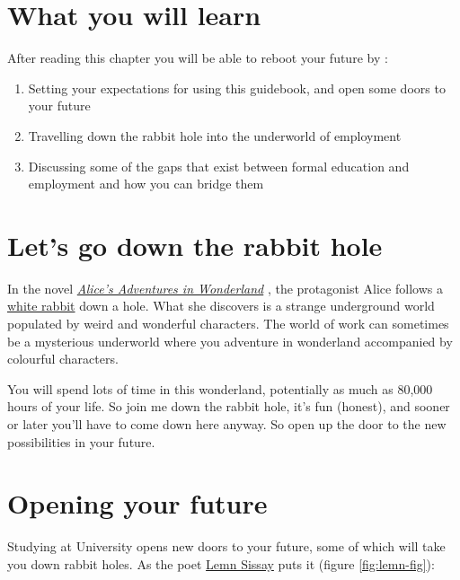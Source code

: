 \documentclass[
]{book}
\providecommand{\tightlist}{%
  \setlength{\itemsep}{0pt}\setlength{\parskip}{0pt}}
\begin{document}
\hypertarget{ilo1}{%
\section{What you will learn}\label{ilo1}}

After reading this chapter you will be able to reboot your future by :

\begin{enumerate}
\def\labelenumi{\arabic{enumi}.}
\tightlist
\item
  Setting your expectations for using this guidebook, and open some doors to your future
\item
  Travelling down the rabbit hole into the underworld of employment
\item
  Discussing some of the gaps that exist between formal education and employment and how you can bridge them
\end{enumerate}

\hypertarget{wonderland}{%
\section{Let's go down the rabbit hole}\label{wonderland}}

In the novel \emph{\href{https://en.wikipedia.org/wiki/Alice\%27s_Adventures_in_Wonderland}{Alice's Adventures in Wonderland}} \citep{wonderland}, the protagonist Alice follows a \href{https://en.wikipedia.org/wiki/White_Rabbit}{white rabbit} down a hole. What she discovers is a strange underground world populated by weird and wonderful characters. The world of work can sometimes be a mysterious underworld where you adventure in wonderland accompanied by colourful characters.

You will spend lots of time in this wonderland, potentially as much as 80,000 hours of your life. \citep{iip1, iip2} So join me down the rabbit hole, it's fun (honest), and sooner or later you'll have to come down here anyway. So open up the door to the new possibilities in your future.

\hypertarget{opening}{%
\section{Opening your future}\label{opening}}

Studying at University opens new doors to your future, some of which will take you down rabbit holes. As the poet \href{https://en.wikipedia.org/wiki/Lemn_Sissay}{Lemn Sissay} puts it (figure \ref{fig:lemn-fig}):
\end{document}
